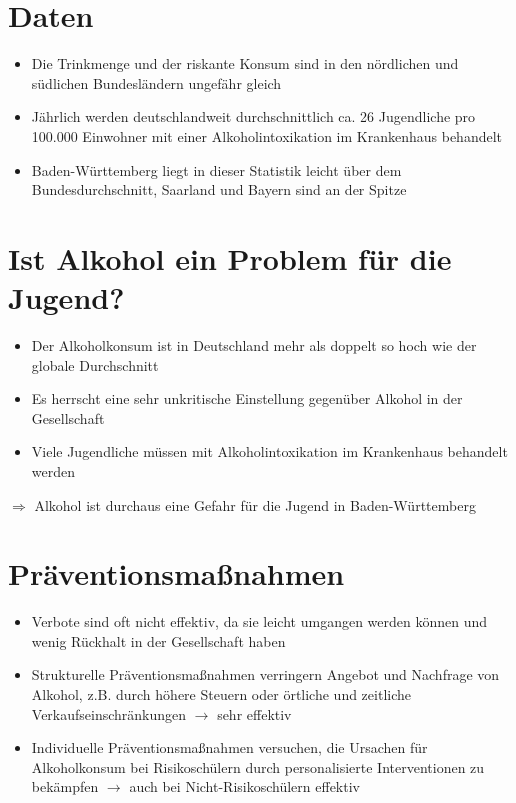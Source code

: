 \documentclass[12pt]{article}
\begin{document}
 \section*{Daten}
 \begin{itemize}
    \item Die Trinkmenge und der riskante Konsum sind in den nördlichen und südlichen Bundesländern ungefähr gleich
    \item Jährlich werden deutschlandweit durchschnittlich ca. 26 Jugendliche pro 100.000 Einwohner mit einer Alkoholintoxikation im Krankenhaus behandelt
    \item Baden-Württemberg liegt in dieser Statistik leicht über dem Bundesdurchschnitt, Saarland und Bayern sind an der Spitze
 \end{itemize}
 
 \section*{Ist Alkohol ein Problem für die Jugend?}
 \begin{itemize}
    \item Der Alkoholkonsum ist in Deutschland mehr als doppelt so hoch wie der globale Durchschnitt
    \item Es herrscht eine sehr unkritische Einstellung gegenüber Alkohol in der Gesellschaft
    \item Viele Jugendliche müssen mit Alkoholintoxikation im Krankenhaus behandelt werden
 \end{itemize}
 \par$\Rightarrow$ Alkohol ist durchaus eine Gefahr für die Jugend in Baden-Württemberg

 \section*{Präventionsmaßnahmen}
 \begin{itemize}
    \item Verbote sind oft nicht effektiv, da sie leicht umgangen werden können und wenig Rückhalt in der Gesellschaft haben
    \item Strukturelle Präventionsmaßnahmen verringern Angebot und Nachfrage von Alkohol, z.B. durch höhere Steuern oder örtliche und zeitliche Verkaufseinschränkungen $\rightarrow$ sehr effektiv
    \item Individuelle Präventionsmaßnahmen versuchen, die Ursachen für Alkoholkonsum bei Risikoschülern durch personalisierte Interventionen zu bekämpfen $\rightarrow$ auch bei Nicht-Risikoschülern effektiv
\end{itemize}
\clearpage
\end{document}
